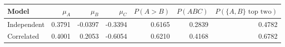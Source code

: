\begin{tabular}{lrrrrrr}
\toprule
Model & $\mu_A$ & $\mu_B$ & $\mu_C$ & $P(A>B)$ & $P(ABC)$ & $P(\{A,B\}\text{ top two})$ \\
\midrule
Independent & 0.3791 & -0.0397 & -0.3394 & 0.6165 & 0.2839 & 0.4782 \\
Correlated & 0.4001 & 0.2053 & -0.6054 & 0.6210 & 0.4168 & 0.6782 \\
\bottomrule
\end{tabular}
